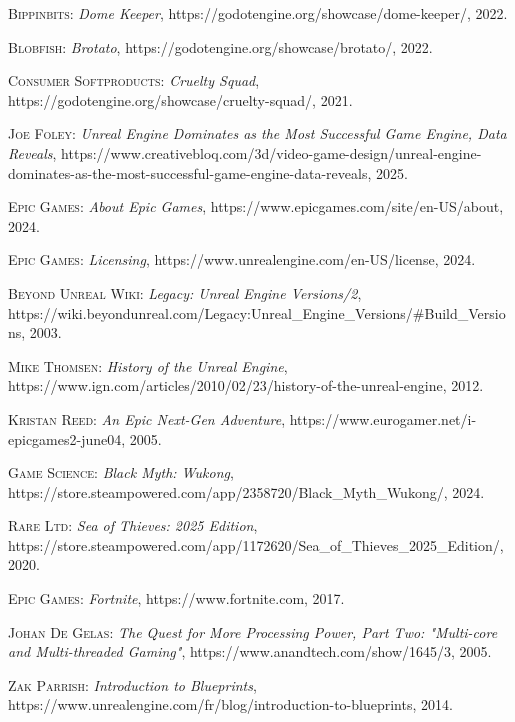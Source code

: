 \documentclass[
]{thesis-ekf}
\theoremstyle{definition}
\theoremstyle{remark}
\begin{document}
\begin{thebibliography}{2}
		\textsc{Bippinbits}: \emph{Dome Keeper}, https://godotengine.org/showcase/dome-keeper/, 2022.
		
		\textsc{Blobfish}: \emph{Brotato}, https://godotengine.org/showcase/brotato/, 2022.
		
		\textsc{Consumer Softproducts}: \emph{Cruelty Squad}, https://godotengine.org/showcase/cruelty-squad/, 2021.
		
		\textsc{Joe Foley}: \emph{Unreal Engine Dominates as the Most Successful Game Engine, Data Reveals}, https://www.creativebloq.com/3d/video-game-design/unreal-engine-dominates-as-the-most-successful-game-engine-data-reveals, 2025.
		
		\textsc{Epic Games}: \emph{About Epic Games}, https://www.epicgames.com/site/en-US/about, 2024.
		
		\textsc{Epic Games}: \emph{Licensing}, https://www.unrealengine.com/en-US/license, 2024.
		
		\textsc{Beyond Unreal Wiki}: \emph{Legacy: Unreal Engine Versions/2}, https://wiki.beyondunreal.com/Legacy:Unreal\_Engine\_Versions/\#Build\_Versions, 2003.
		
		\textsc{Mike Thomsen}: \emph{History of the Unreal Engine}, https://www.ign.com/articles/2010/02/23/history-of-the-unreal-engine, 2012.
		
		\textsc{Kristan Reed}: \emph{An Epic Next-Gen Adventure}, https://www.eurogamer.net/i-epicgames2-june04, 2005.
		
		\textsc{Game Science}: \emph{Black Myth: Wukong}, https://store.steampowered.com/app/2358720/Black\_Myth\_Wukong/, 2024.
		
		\textsc{Rare Ltd}: \emph{Sea of Thieves: 2025 Edition}, https://store.steampowered.com/app/1172620/Sea\_of\_Thieves\_2025\_Edition/, 2020.
		
		\textsc{Epic Games}: \emph{Fortnite}, https://www.fortnite.com, 2017.
		
		\textsc{Johan De Gelas}: \emph{The Quest for More Processing Power, Part Two: "Multi-core and Multi-threaded Gaming"}, https://www.anandtech.com/show/1645/3, 2005.
		
		\textsc{Zak Parrish}: \emph{Introduction to Blueprints}, https://www.unrealengine.com/fr/blog/introduction-to-blueprints, 2014.
		

\end{thebibliography}
\end{document}
